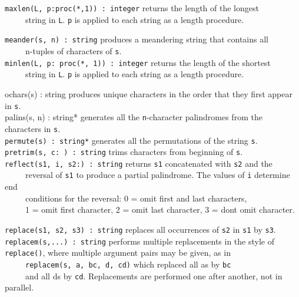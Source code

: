 \texttt{maxlen(L, p:proc({\textquotedbl}*{\textquotedbl},1)) : integer}
returns the length of the longest\\
 \ \ \ \ \ string in \texttt{L}. \texttt{p} is applied to each string as
a {\textquotedbl}length{\textquotedbl} procedure.

\texttt{meander(s, n) : string} produces a
{\textquotedbl}meandering{\textquotedbl} string that contains
all\\
 \ \ \ \ \ n-tuples of characters of \texttt{s}.\\
\texttt{minlen(L, p: proc({\textquotedbl}*{\textquotedbl}, 1)) :
integer} returns the length of the shortest\\
 \ \ \ \ \ string in \texttt{L}. \texttt{p} is applied to each string as
a {\textquotedbl}length{\textquotedbl} procedure.

\textsf{ochars(s) : string} produces unique characters in the order that
they first appear in \texttt{s}.\\
\textsf{palins(s, n) : string*} generates all the \texttt{n}{}-character
palindromes from the characters in
\texttt{s}.\\
\texttt{permute(s) : string*} generates all the permutations of the
string \texttt{s}.\\
\texttt{pretrim(s, c:{\textquotesingle} {\textquotesingle}) : string}
trims characters from beginning of \texttt{s}.\\
\texttt{reflect(s1, i, s2:{\textquotedbl}{\textquotedbl}) : string}
returns \texttt{s1} concatenated with \texttt{s2} and the\\
 \ \ \ \ \ reversal of \texttt{s1} to produce a partial palindrome. The
values of \texttt{i} determine {\textquotedbl}end\\
 \ \ \ \ \ conditions{\textquotedbl} for the reversal: 0 = omit first
and last characters,\\
 \ \ \ \ \ 1 = omit first character, 2 = omit last character, 3 =
don{\textquotesingle}t omit character.

\texttt{replace(s1, s2, s3) : string} replaces all occurrences of
\texttt{s2} in \texttt{s1} by \texttt{s3}.\\
\texttt{replacem(s,...) : string} performs multiple replacements in the style of \texttt{replace()}, where multiple
argument pairs may be given, as in\\
 \ \ \ \ \ \texttt{replacem(s, {\textquotedbl}a{\textquotedbl},
{\textquotedbl}bc{\textquotedbl}, {\textquotedbl}d{\textquotedbl},
{\textquotedbl}cd{\textquotedbl})} which replaced all
a{\textquotesingle}s by
\texttt{{\textquotedbl}bc{\textquotedbl}\\
} \ \ \ \ \ and all d{\textquotesingle}s by
\texttt{{\textquotedbl}cd{\textquotedbl}}. Replacements are performed
one after another, not in parallel.

